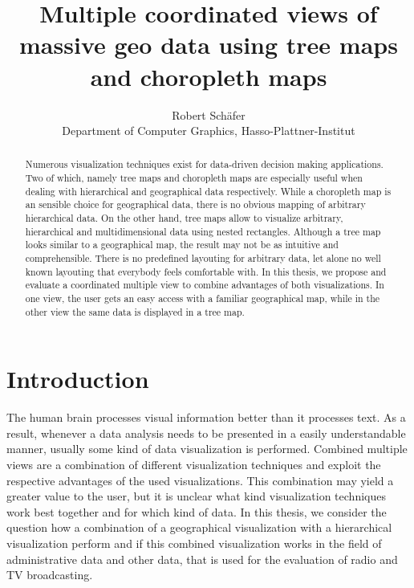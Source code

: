 \documentclass{article}
\begin{document}
\title{Multiple coordinated views of massive geo data using tree maps and choropleth maps}
\author{Robert Schäfer\\ Department of Computer Graphics, Hasso-Plattner-Institut}
\maketitle

\newcommand{\rufu}{Rundfunk \textsc{mitbestimmen}}
\newcommand\hmm[1]{\ifnum\ifhmode\spacefactor\else2000\fi>1000 \uppercase{#1}\else#1\fi}
\newcommand{\cmv}{\hmm{c}oordinated multiple view}
\newcommand{\cmvs}{\hmm{c}oordinated multiple views}

\begin{abstract}
  Numerous visualization techniques exist for data-driven decision making applications.
  Two of which, namely tree maps and choropleth maps are especially useful when dealing with hierarchical and geographical data respectively.
  While a choropleth map is an sensible choice for geographical data, there is no obvious mapping of arbitrary hierarchical data.
  On the other hand, tree maps allow to visualize arbitrary, hierarchical and multidimensional data using nested rectangles.
  Although a tree map looks similar to a geographical map, the result may not be as intuitive and comprehensible.
  There is no predefined layouting for arbitrary data, let alone no well known layouting that everybody feels comfortable with.
  In this thesis, we propose and evaluate a coordinated multiple view to combine advantages of both visualizations.
  In one view, the user gets an easy access with a familiar geographical map, while in the other view the same data is displayed in a tree map.
\end{abstract}

\section{Introduction}
The human brain processes visual information better than it processes text.
As a result, whenever a data analysis needs to be presented in a easily understandable manner, usually some kind of data visualization is performed.
Combined multiple views are a combination of different visualization techniques and exploit the respective advantages of the used visualizations.
This combination may yield a greater value to the user, but it is unclear what kind visualization techniques work best together and for which kind of data.
In this thesis, we consider the question how a combination of a geographical visualization with a hierarchical visualization perform and if this combined visualization works in the field of administrative data and other data, that is used for the evaluation of radio and TV broadcasting.
\end{document}
